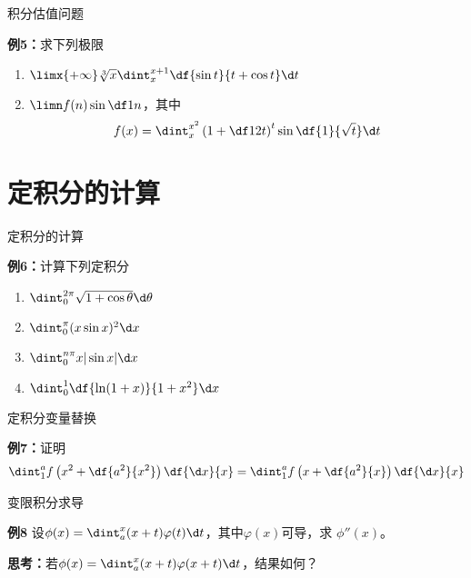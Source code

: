 \begin{frame}{积分估值问题}
	\linespread{1.2}\pause 
	\begin{exampleblock}{{\bf 例5：}求下列极限\hfill }\pause 
		\begin{enumerate}
		  \item $\limx{+\infty}\sqrt[3]x\dint_x^{x+1}\df{\sin t}{t+\cos t}\d t$\pause 
		  \item $\limn f(n)\sin\df 1n$，其中
		  $$f(x)=\dint_x^{x^2}\left(1+\df 1{2t}\right)^t\sin\df{1}{\sqrt t}\d t$$
		\end{enumerate}
	\end{exampleblock}
\end{frame}

\section{定积分的计算}

\begin{frame}{定积分的计算}
	\linespread{1.2}\pause 
	\begin{exampleblock}{{\bf 例6：}计算下列定积分\hfill }\pause 
		\begin{enumerate}
		  \item $\dint_0^{2\pi}\sqrt{1+\cos\theta}\d\theta$\pause 
		  \item $\dint_0^{\pi}(x\sin x)^2\d x$\pause 
		  \item $\dint_0^{n\pi}x|\sin x|\d x$\pause 
		  \item $\dint_0^1\df{\ln(1+x)}{1+x^2}\d x$
		\end{enumerate}
	\end{exampleblock}
\end{frame}

\begin{frame}{定积分变量替换}
	\linespread{1.2}
	\begin{exampleblock}{{\bf 例7：}证明\hfill }
		$$\dint_1^af\left(x^2+\df{a^2}{x^2}\right)\df{\d x}{x}
		=\dint_1^af\left(x+\df{a^2}{x}\right)\df{\d x}{x}$$
	\end{exampleblock}
\end{frame}

\begin{frame}{变限积分求导}
	\linespread{1.2}
	\begin{exampleblock}{{\bf 例8}\hfill }
		设$\phi(x)=\dint_a^x(x+t)\varphi(t)\d t$，其中$\varphi(x)$可导，求
		$\phi''(x)$。
	\end{exampleblock}\pause 
	{\bf 思考：}若$\phi(x)=\dint_a^x(x+t)\varphi(x+t)\d t$，结果如何？
\end{frame}

